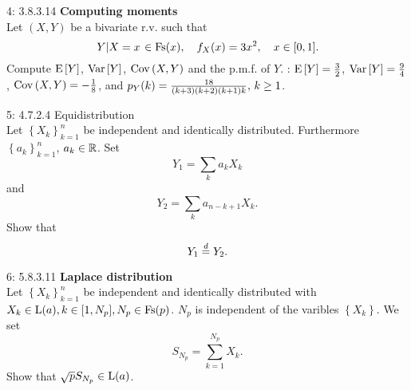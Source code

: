\documentclass[a4paper,twoside=false,abstract=false,numbers=noenddot,
titlepage=false,headings=small,parskip=half,version=last]{scrartcl}
\begin{document}
\begin{exercise}{4: 3.8.3.14} \textbf{Computing moments} \\
    Let $(X,Y)$ be a bivariate r.v. such that
    \begin{equation}
        \left. Y \middle\vert X=x \right. \in \text{Fs}(x),\quad
        f_X(x)=3x^2,\quad
        x\in [0, 1].
    \end{equation}
    Compute ${\rm E}\,[Y]$, ${\rm Var}\,[Y]$, ${\rm Cov}\,(X, Y)$ and the p.m.f.
    of $Y$.
    \Answer:
    ${{\rm E}\,[Y]=\frac{3}{2}}$,
    ${{\rm Var}\,[Y]=\frac{9}{4}}$,
    ${{\rm Cov}\,(X,Y)=-\frac{1}{8}}$, and
    $p_{Y} (k) = \frac{18}{(k+3)(k+2)(k+1)k},\, k \ge 1$.

\end{exercise}
\begin{solution}
\end{solution}
\pagebreak

\begin{exercise}{5: 4.7.2.4} Equidistribution \\
    Let $\left\{{X_k}\right\}_{k=1}^n$ be independent and identically
    distributed. Furthermore $\left\{{a_k}\right\}_{k=1}^n$, $a_k \in \mathbb{R}$. Set
    \begin{equation}
        Y_1 = \sum\limits_k a_k X_k
    \end{equation}
    and
    \begin{equation}
        Y_2 = \sum\limits_k a_{n-k+1} X_k.
    \end{equation}
    Show that
    \begin{equation}
        Y_1 \stackrel{d}{=} Y_2.
    \end{equation}
\end{exercise}
\begin{solution}
\end{solution}
\pagebreak

\begin{exercise}{6: 5.8.3.11} \textbf{Laplace distribution} \\
    Let $\left\{{X_k}\right\}_{k=1}^n$ be independent and identically
    distributed with
    ${X_k \in\text{L}(a),}\, {k\in[1,N_p],}\, {N_p\in \text{Fs}(p)}$.
    $N_p$ is independent of the varibles $\left\{X_k\right\}$. We set
    \begin{equation}
        S_{N_p} = \sum\limits_{k=1}^{N_p}X_k.
    \end{equation}
    Show that $\sqrt{p}S_{N_p}\in\text{L}(a)$.
\end{exercise}
\begin{solution}
\end{solution}
\pagebreak
\end{document}
